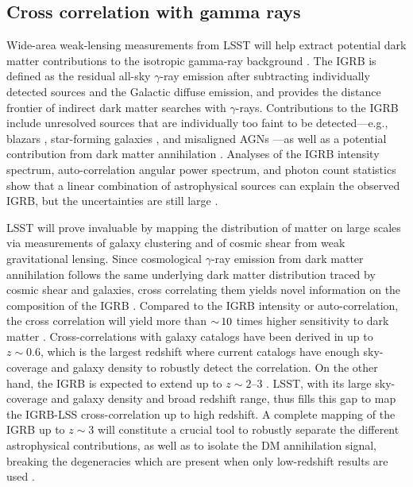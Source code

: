 \subsection{Cross correlation with gamma rays }
\label{sec:igrb_id}

Wide-area weak-lensing measurements from LSST will help extract  potential dark matter contributions to the isotropic gamma-ray background \citep[IGRB;][]{1410.3696}. The IGRB is defined as the residual all-sky $\gamma$-ray emission after subtracting individually detected sources and the Galactic diffuse emission, and provides the distance frontier of indirect dark matter searches with $\gamma$-rays. Contributions to the IGRB include unresolved sources that are individually too faint to be detected---e.g., blazars \citep{1110.3787,1310.0006}, star-forming galaxies \citep{1206.1346}, and misaligned AGNs \citep{1304.0908}---as well as a potential contribution from dark matter annihilation \citep{1312.0608,1501.05464,1501.05301,1608.07289}. Analyses of the IGRB intensity spectrum, auto-correlation angular power spectrum, and photon count statistics show that a linear combination of astrophysical sources can explain the observed IGRB, but the uncertainties are still large \citep[e.g.,][]{1502.02866}.

LSST will prove invaluable by mapping the distribution of matter on large scales via measurements of galaxy clustering and of cosmic shear from weak gravitational lensing. 
Since  cosmological $\gamma$-ray emission from dark matter annihilation follows the same underlying dark matter distribution traced by cosmic shear and galaxies, cross correlating them yields novel information on the composition of the IGRB \citep{1212.5018,1312.4403,1411.4651,1506.01030,Lisanti:2018}. 
Compared to the IGRB intensity or auto-correlation, the cross correlation will yield more than $ {\sim}\, 10$ times higher sensitivity to dark matter \citep{1411.4651,1503.05922}.
Cross-correlations with galaxy catalogs have been derived in \cite{1103.4861,1503.05918,1709.01940} up to $z \sim 0.6$, 
which is the largest redshift where current catalogs have enough sky-coverage and galaxy density to robustly
detect the correlation.  On the other hand, the IGRB is expected to extend up to $z \sim 2$--$3$ \citep{1502.02866}. 
LSST, with its large sky-coverage and galaxy density and broad redshift range, thus fills this gap to map the IGRB-LSS cross-correlation up to high redshift. 
A complete mapping of the IGRB up to $z \sim 3$ will constitute a crucial tool to robustly separate the different 
astrophysical contributions, as well as to isolate the DM annihilation signal, breaking the degeneracies which
are present when only low-redshift results are used \citep{1506.01030}.    

